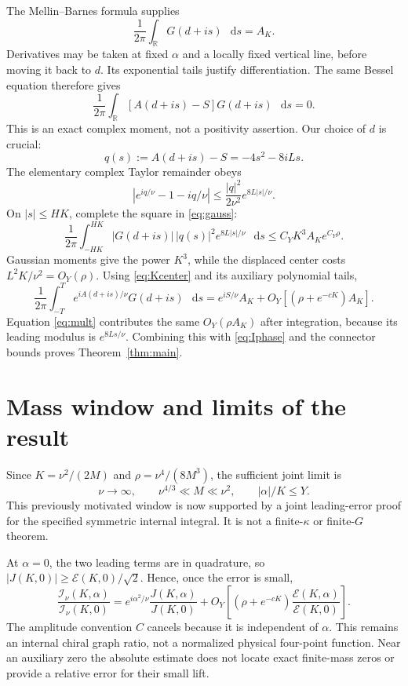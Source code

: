 \documentclass[11pt,a4paper]{article}
\newcommand{\dd}{\mathop{}\!\mathrm d}
\newcommand{\E}{\mathcal E}
\begin{document}
The Mellin--Barnes formula \cite{MB} supplies
\[
 \frac1{2\pi}\int_{\mathbb R}G(d+is)\,\dd s=A_K.
\]
Derivatives may be taken at fixed \(\alpha\) and a locally fixed
vertical line, before moving it back to \(d\). Its exponential tails
justify differentiation. The same Bessel equation therefore gives
\begin{equation}\label{eq:Kcenter}
 \frac1{2\pi}\int_{\mathbb R}[A(d+is)-S]G(d+is)\,\dd s=0.
\end{equation}
This is an exact complex moment, not a positivity assertion.
Our choice of \(d\) is crucial:
\[
 q(s):=A(d+is)-S=-4s^2-8iLs.
\]
The elementary complex Taylor remainder obeys
\[
 |e^{iq/\nu}-1-iq/\nu|
 \le\frac{|q|^2}{2\nu^2}e^{8L|s|/\nu}.
\]
On \(|s|\le HK\), complete the square in \eqref{eq:gauss}:
\[
 \frac1{2\pi}\int_{-HK}^{HK}
 |G(d+is)|\,|q(s)|^2 e^{8L|s|/\nu}\,\dd s
 \le C_Y K^3 A_K e^{C_Y\rho}.
\]
Gaussian moments give the power \(K^3\), while the displaced center
costs \(L^2K/\nu^2=O_Y(\rho)\).
Using \eqref{eq:Kcenter} and its auxiliary polynomial tails,
\[
 \frac1{2\pi}\int_{-T}^{T}e^{iA(d+is)/\nu}G(d+is)\,\dd s
 =e^{iS/\nu}A_K+O_Y[(\rho+e^{-cK})A_K].
\]
Equation \eqref{eq:mult} contributes the same \(O_Y(\rho A_K)\)
after integration, because its leading modulus is \(e^{8Ls/\nu}\).
Combining this with \eqref{eq:Iphase} and the connector bounds proves
Theorem~\ref{thm:main}.

\section{Mass window and limits of the result}
Since \(K=\nu^2/(2M)\) and \(\rho=\nu^4/(8M^3)\),
the sufficient joint limit is
\[
 \nu\to\infty,\qquad \nu^{4/3}\ll M\ll\nu^2,
 \qquad |\alpha|/K\le Y.
\]
This previously motivated window is now supported by a joint
leading-error proof for the specified symmetric internal integral.
It is not a finite-\(\kappa\) or finite-\(G\) theorem.

At \(\alpha=0\), the two leading terms are in quadrature, so
\(|J(K,0)|\ge\E(K,0)/\sqrt2\). Hence, once the error is small,
\[
 \frac{\mathcal I_\nu(K,\alpha)}{\mathcal I_\nu(K,0)}
 =e^{i\alpha^2/\nu}\frac{J(K,\alpha)}{J(K,0)}
 +O_Y\!\left[
   (\rho+e^{-cK})\frac{\E(K,\alpha)}{\E(K,0)}
 \right].
\]
The amplitude convention \(C\) cancels because it is independent
of \(\alpha\). This remains an internal chiral graph ratio, not a
normalized physical four-point function. Near an auxiliary zero
the absolute estimate does not locate exact finite-mass zeros or
provide a relative error for their small lift.
\end{document}
